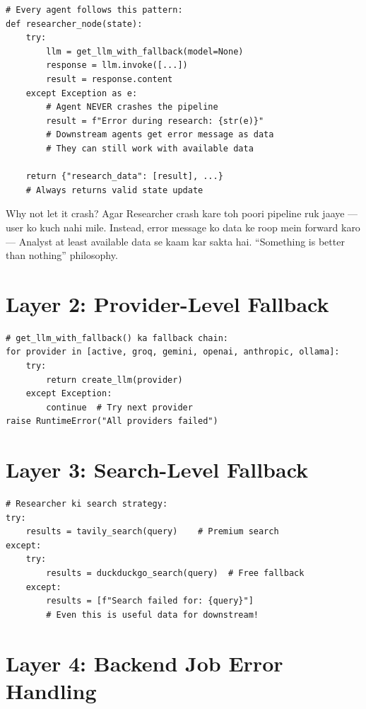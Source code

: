 \documentclass[11pt,a4paper,twoside]{report}
\begin{document}
\begin{lstlisting}[style=pythonstyle]
# Every agent follows this pattern:
def researcher_node(state):
    try:
        llm = get_llm_with_fallback(model=None)
        response = llm.invoke([...])
        result = response.content
    except Exception as e:
        # Agent NEVER crashes the pipeline
        result = f"Error during research: {str(e)}"
        # Downstream agents get error message as data
        # They can still work with available data

    return {"research_data": [result], ...}
    # Always returns valid state update
\end{lstlisting}

\begin{hindibox}{Why not let it crash?}
Agar Researcher crash kare toh poori pipeline ruk jaaye --- user ko kuch nahi mile. Instead, error message ko data ke roop mein forward karo --- Analyst at least available data se kaam kar sakta hai. ``Something is better than nothing'' philosophy.
\end{hindibox}

\section{Layer 2: Provider-Level Fallback}

\begin{lstlisting}[style=pythonstyle]
# get_llm_with_fallback() ka fallback chain:
for provider in [active, groq, gemini, openai, anthropic, ollama]:
    try:
        return create_llm(provider)
    except Exception:
        continue  # Try next provider
raise RuntimeError("All providers failed")
\end{lstlisting}

\section{Layer 3: Search-Level Fallback}

\begin{lstlisting}[style=pythonstyle]
# Researcher ki search strategy:
try:
    results = tavily_search(query)    # Premium search
except:
    try:
        results = duckduckgo_search(query)  # Free fallback
    except:
        results = [f"Search failed for: {query}"]
        # Even this is useful data for downstream!
\end{lstlisting}

\section{Layer 4: Backend Job Error Handling}
\end{document}
